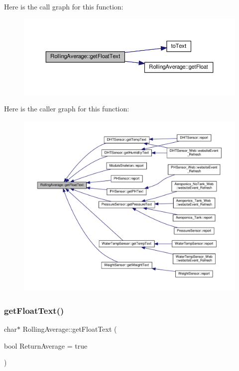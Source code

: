 Here is the call graph for this function\+:
\nopagebreak
\begin{figure}[H]
\begin{center}
\leavevmode
\includegraphics[width=350pt]{class_rolling_average_aab001a981060af0948bd8b46c05c8e97_cgraph}
\end{center}
\end{figure}
Here is the caller graph for this function\+:
\nopagebreak
\begin{figure}[H]
\begin{center}
\leavevmode
\includegraphics[width=350pt]{class_rolling_average_aab001a981060af0948bd8b46c05c8e97_icgraph}
\end{center}
\end{figure}
\mbox{\label{class_rolling_average_a045fc2bb9fe445bad004dd05e5bd6564}} 
\subsubsection{\texorpdfstring{get\+Float\+Text()}{getFloatText()}\hspace{0.1cm}{\footnotesize\ttfamily [2/2]}}
{\footnotesize\ttfamily char$\ast$ Rolling\+Average\+::get\+Float\+Text (\begin{DoxyParamCaption}\item[{bool}]{Return\+Average = {\ttfamily true} }\end{DoxyParamCaption})}

